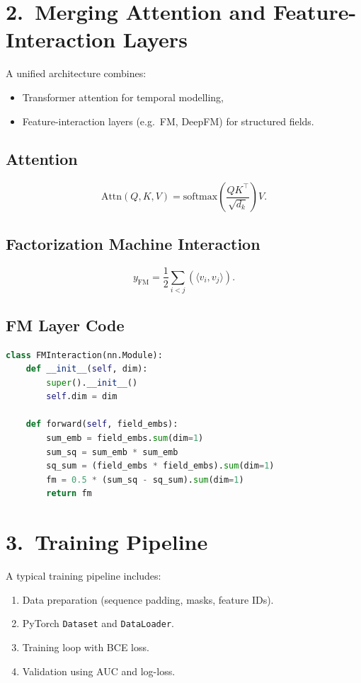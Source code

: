 \documentclass[12pt]{article}
\begin{document}
\section{2.\ Merging Attention and Feature-Interaction Layers}
A unified architecture combines:
\begin{itemize}
    \item Transformer attention for temporal modelling,
    \item Feature-interaction layers (e.g.\ FM, DeepFM) for structured fields.
\end{itemize}

\subsection*{Attention}
\[
\mathrm{Attn}(Q,K,V)
= \mathrm{softmax}\!\left(\frac{QK^\top}{\sqrt{d_k}}\right)V.
\]

\subsection*{Factorization Machine Interaction}
\[
y_{\mathrm{FM}}
= \frac{1}{2}\sum_{i<j}
\left(
\langle v_i, v_j\rangle
\right).
\]

\subsection*{FM Layer Code}
\begin{lstlisting}[language=Python]
class FMInteraction(nn.Module):
    def __init__(self, dim):
        super().__init__()
        self.dim = dim

    def forward(self, field_embs):
        sum_emb = field_embs.sum(dim=1)
        sum_sq = sum_emb * sum_emb
        sq_sum = (field_embs * field_embs).sum(dim=1)
        fm = 0.5 * (sum_sq - sq_sum).sum(dim=1)
        return fm
\end{lstlisting}

\section{3.\ Training Pipeline}
A typical training pipeline includes:
\begin{enumerate}
    \item Data preparation (sequence padding, masks, feature IDs).
    \item PyTorch \texttt{Dataset} and \texttt{DataLoader}.
    \item Training loop with BCE loss.
    \item Validation using AUC and log-loss.
\end{enumerate}
\end{document}

